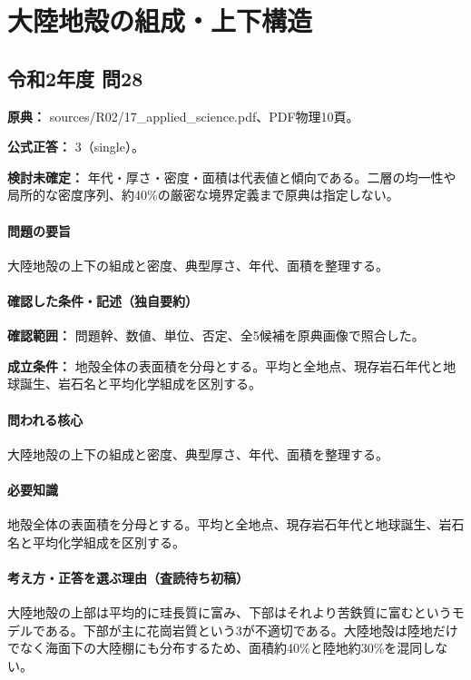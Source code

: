 \section{大陸地殻の組成・上下構造}

\subsection{令和2年度 問28}
\label{q:r02-reg-applied-28}

\noindent\textbf{原典：} sources/R02/17\_applied\_science.pdf、PDF物理10頁。

\textbf{公式正答：} 3（single）。

\par\textbf{検討未確定：} 年代・厚さ・密度・面積は代表値と傾向である。二層の均一性や局所的な密度序列、約40\%の厳密な境界定義まで原典は指定しない。

\paragraph{問題の要旨} 大陸地殻の上下の組成と密度、典型厚さ、年代、面積を整理する。

\paragraph{確認した条件・記述（独自要約）}\mbox{}\par

\noindent\textbf{確認範囲：} 問題幹、数値、単位、否定、全5候補を原典画像で照合した。\par

\noindent\textbf{成立条件：} 地殻全体の表面積を分母とする。平均と全地点、現存岩石年代と地球誕生、岩石名と平均化学組成を区別する。\par

\paragraph{問われる核心} 大陸地殻の上下の組成と密度、典型厚さ、年代、面積を整理する。

\paragraph{必要知識} 地殻全体の表面積を分母とする。平均と全地点、現存岩石年代と地球誕生、岩石名と平均化学組成を区別する。

\paragraph{考え方・正答を選ぶ理由（査読待ち初稿）} 大陸地殻の上部は平均的に珪長質に富み、下部はそれより苦鉄質に富むというモデルである。下部が主に花崗岩質という3が不適切である。大陸地殻は陸地だけでなく海面下の大陸棚にも分布するため、面積約40\%と陸地約30\%を混同しない。

